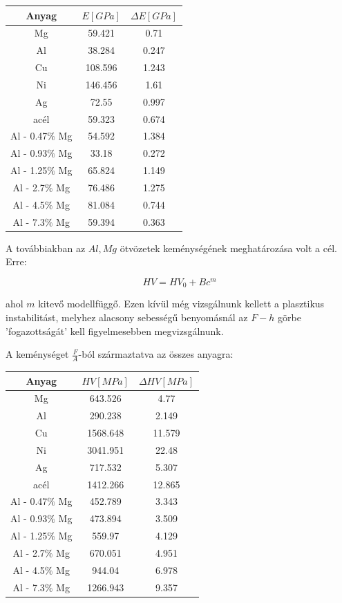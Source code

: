 \documentclass[a4paper,12pt]{article}
\begin{document}
\begin{center}
\begin{tabular}{|c|c|c|}
\hline
Anyag & $E [GPa]$ & $\Delta E [GPa]$ \\
\hline
Mg & 59.421& 0.71\\
\hline
Al &38.284 &0.247\\
\hline
Cu &108.596 &1.243\\
\hline
Ni &146.456 &1.61\\
\hline
Ag &72.55 &0.997\\
\hline
acél &59.323 &0.674\\
\hline
Al - 0.47$\%$ Mg &54.592& 1.384\\
\hline
Al - 0.93$\%$ Mg &33.18 &0.272\\
\hline
Al - 1.25$\%$ Mg &65.824& 1.149\\
\hline
Al - 2.7$\%$ Mg &76.486& 1.275\\
\hline
Al - 4.5$\%$ Mg &81.084& 0.744\\
\hline
Al - 7.3$\%$ Mg &59.394& 0.363\\
\hline
\end{tabular}
\end{center}

\par A továbbiakban az $Al, Mg$ ötvözetek keménységének meghatározása volt a cél. Erre:

\begin{equation*}
HV = HV_{0} + Bc^{m}
\end{equation*}

\par ahol $m$ kitevő modellfüggő. Ezen kívül még vizsgálnunk kellett a plasztikus instabilitást, melyhez alacsony sebességű benyomásnál az $F-h$ görbe 'fogazottságát' kell figyelmesebben megvizsgálnunk. 

\par A keménységet $\frac{F}{A}$-ból származtatva az összes anyagra:

\begin{center}
\begin{tabular}{|c|c|c|}
\hline
Anyag & $HV [MPa]$ & $\Delta HV [MPa]$ \\
\hline
Mg& 643.526&  4.77\\
\hline
Al & 290.238 & 2.149\\
\hline
Cu & 1568.648 & 11.579\\
\hline
Ni & 3041.951&  22.48\\
\hline
Ag & 717.532 & 5.307\\
\hline
acél & 1412.266 & 12.865\\
\hline
Al - 0.47$\%$ Mg & 452.789&  3.343\\
\hline
Al - 0.93$\%$ Mg & 473.894 & 3.509\\
\hline
Al - 1.25$\%$ Mg & 559.97&  4.129\\
\hline
Al - 2.7$\%$ Mg & 670.051 & 4.951\\
\hline
Al - 4.5$\%$ Mg & 944.04 & 6.978\\
\hline
Al - 7.3$\%$ Mg & 1266.943 & 9.357\\
\hline
\end{tabular}
\end{center}
\end{document}
